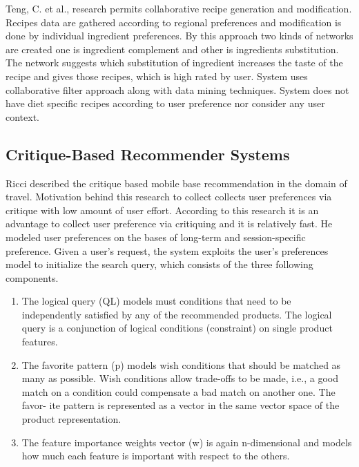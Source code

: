 Teng, C. et al.,\cite{teng2012recipe} research permits collaborative recipe generation and modification. Recipes data are gathered according to regional preferences and modification is done by individual ingredient preferences. By this approach two kinds of networks are created one is ingredient complement and other is ingredients substitution. The network suggests which substitution of ingredient increases the taste of the recipe and gives those recipes, which is high rated by user. System uses collaborative filter approach along with data mining techniques. System does not have diet specific recipes according to user preference nor consider any user context. \newline

\subsection{Critique-Based Recommender Systems}

Ricci \cite{ricci2005critique} described the critique based  mobile base recommendation in the domain of travel. Motivation behind this research to collect collects user preferences via critique with low amount of user effort. According to this research it is an advantage to collect user preference via critiquing and it is relatively fast. He modeled user preferences on the bases of long-term and session-specific preference. Given a user’s request, the system exploits the user’s preferences model to initialize the search query, which consists of the three following components. 

\begin{enumerate}
		\item The logical query (QL) models must conditions that need to be independently satisfied by any of the recommended products. The logical query is a conjunction of logical conditions (constraint) on single product features. 
		
		\item The favorite pattern (p) models wish conditions that should be matched as many as possible. Wish conditions allow trade-offs to be made, i.e., a good match on a condition could compensate a bad match on another one. The favor- ite pattern is represented as a vector in the same vector space of the product representation. 
		
		\item The feature importance weights vector (w) is again n-dimensional and models how much each feature is important with respect to the others.
			
\end{enumerate}


